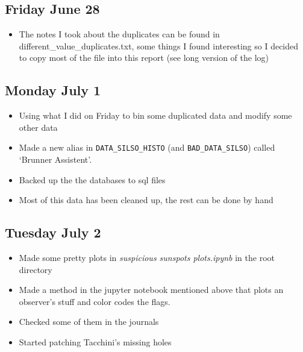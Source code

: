 \documentclass[12pt]{article}
\begin{document}
\subsection{Friday June 28} 
\begin{itemize}
    \item The notes I took about the duplicates can be found in different\_value\_duplicates.txt, some things I found interesting so I decided to copy most of the file into this report (see long version of the log)
\end{itemize}
    
\subsection{Monday July 1}
\begin{itemize}
    \item Using what I did on Friday to bin some duplicated data and modify some other data
    \item Made a new alias in \texttt{DATA\_SILSO\_HISTO} (and \texttt{BAD\_DATA\_SILSO}) called `Brunner Assistent'.
    \item Backed up the the databases to sql files
    \item Most of this data has been cleaned up, the rest can be done by hand
\end{itemize}
    
\subsection{Tuesday July 2}
\begin{itemize}
    \item Made some pretty plots in \textit{suspicious sunspots plots.ipynb} in the root directory
    \item Made a method in the jupyter notebook mentioned above that plots an observer's stuff and color codes the flags.
    \item Checked some of them in the journals
    \item Started patching Tacchini's missing holes
\end{itemize}
    
\end{document}
